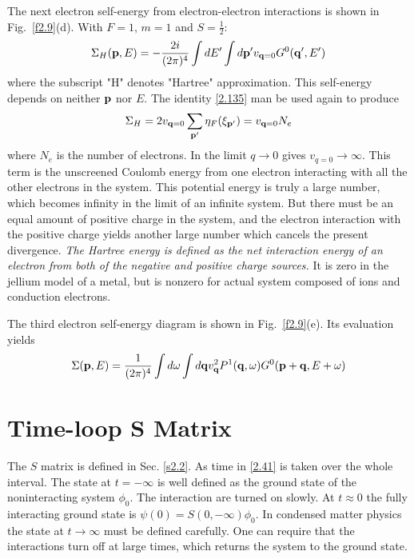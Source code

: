 The next electron self-energy from electron-electron interactions is shown in Fig.~\ref{f2.9}(d). With $F=1$, $m=1$ and $S=\frac{1}{2}$:
\begin{equation}
  \label{2.139}
  \Sigma_H(\mathbf{p},E) = -\frac{2i}{(2\pi)^4} \int dE' \int d\mathbf{p}' v_{\mathbf{q}=0} G^0(\mathbf{q}',E')
\end{equation}
where the subscript "H" denotes "Hartree" approximation.
This self-energy depends on neither $\mathbf{p}$ nor $E$.
The identity \eqref{2.135} man be used again to produce
\begin{equation}
  \label{2.140}
  \Sigma_H = 2v_{\mathbf{q}=0} \sum_{\mathbf{p}'} \eta_F(\xi_{\mathbf{p}'}) = v_{\mathbf{q}=0} N_e
\end{equation}
where $N_e$ is the number of electrons.
In the limit $q\to 0$ gives $v_{q=0}\to \infty$.
This term is the unscreened Coulomb energy from one electron interacting with all the other electrons in the system.
This potential energy is truly a large number, which becomes infinity in the limit of an infinite system.
But there must be an equal amount of positive charge in the system, and the electron interaction with the positive charge yields another large number which cancels the present divergence.
\textit{The Hartree energy is defined as the net interaction energy of an electron from both of the negative and positive charge sources.}
It is zero in the jellium model of a metal, but is nonzero for actual system composed of ions and conduction electrons.

The third electron self-energy diagram is shown in Fig.~\ref{f2.9}(e).
Its evaluation yields
\begin{equation}
  \label{2.141}
  \Sigma(\mathbf{p},E) = \frac{1}{(2\pi)^4} \int d\omega \int d \mathbf{q} v_{\mathbf{q}}^2 P^1(\mathbf{q},\omega) G^0(\mathbf{p}+\mathbf{q},E+\omega)
\end{equation}

\section{Time-loop S Matrix}\label{s2.9}
The $S$ matrix is defined in Sec. \ref{s2.2}.
As time in \eqref{2.41} is taken over the whole interval.
The state at $t=-\infty$ is well defined as the ground state of the noninteracting system $\phi_0$.
The interaction are turned on slowly.
At $t\approx 0$ the fully interacting ground state is $\psi(0)= S(0,-\infty)\phi_0$.
In condensed matter physics the state at $t\to \infty$ must be defined carefully.
One can require that the interactions turn off at large times, which returns the system to the ground state.

